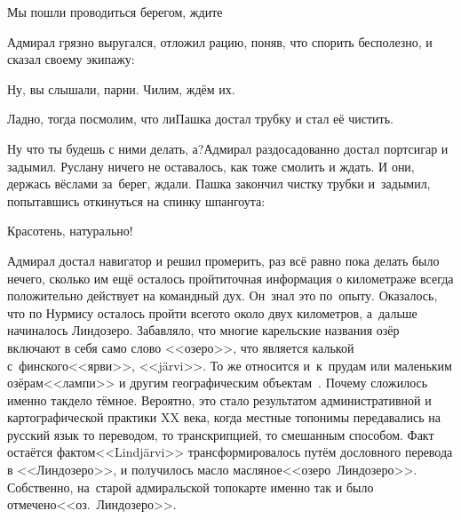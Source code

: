 \diagdash Мы пошли проводиться берегом, ждите\myldots{}

Адмирал грязно выругался, отложил рацию, поняв, что спорить бесполезно, и сказал своему экипажу:

\diagdash Ну, вы слышали, парни. Чилим, ждём их.

\diagdash Ладно, тогда посмолим, что ли\myldots{}\mdash Пашка достал трубку и стал её чистить.

\diagdash Ну что ты будешь с ними делать, а?\mdash Адмирал раздосадованно достал портсигар и задымил. Руслану ничего не оставалось, как тоже смолить и ждать. И они, держась вёслами за~берег, ждали. Пашка закончил чистку трубки и~задымил, попытавшись откинуться на спинку шпангоута:

\diagdash Красотень, натурально!


Адмирал достал навигатор и решил промерить, раз всё равно пока делать было нечего, сколько им ещё осталось пройти\mdash точная информация о километраже всегда положительно действует на командный дух. Он~знал это по~опыту. Оказалось, что по Нурмису осталось пройти всего\sdash то около двух километров, а~дальше начиналось Линдозеро. Забавляло, что многие карельские названия озёр включают в себя само слово <<озеро>>, что является калькой с~финского\mdash <<ярви>>, <<j\"arvi>>. То же относится и~к~прудам или маленьким озёрам\mdash <<лампи>> и другим географическим объектам~\cite{Кузьмин}. Почему сложилось именно так\mdash дело тёмное. Вероятно, это стало результатом административной и картографической практики XX века, когда местные топонимы передавались на русский язык то переводом, то транскрипцией, то смешанным способом. Факт остаётся фактом\mdash <<Lindj\"arvi>> трансформировалось путём дословного перевода в <<Линдозеро>>, и получилось масло масляное\mdash <<озеро~Линдозеро>>. Собственно, на~старой адмиральской топокарте именно так и было отмечено\mdash <<оз.~Линдозеро>>. 

